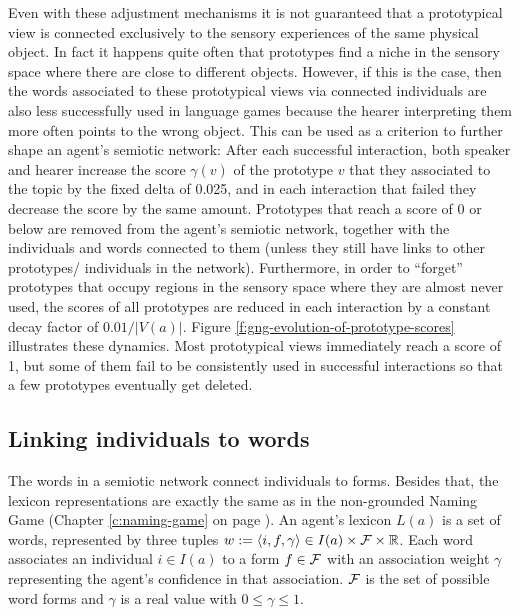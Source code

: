 Even with these adjustment mechanisms it is not guaranteed that a
prototypical view is connected exclusively to the sensory experiences
of the same physical object. In fact it happens quite often that
prototypes find a niche in the sensory space where there are close to
different objects. However, if this is the case, then the words
associated to these prototypical views via connected individuals are
also less successfully used in language games because the hearer
interpreting them more often points to the wrong object. This can be
used as a criterion to further shape an agent's semiotic network:
After each successful interaction, both speaker and hearer increase
the score $\gamma(v)$ of the prototype $v$ that they associated to the
topic by the fixed delta of 0.025, and in each interaction that failed
they decrease the score by the same amount. Prototypes that reach a
score of 0 or below are removed from the agent's semiotic network,
together with the individuals and words connected to them (unless they
still have links to other prototypes/ individuals in the
network). Furthermore, in order to ``forget'' prototypes that occupy
regions in the sensory space where they are almost never used, the
scores of all prototypes are reduced in each interaction by a constant
decay factor of $0.01 / |V(a)|$. Figure
\ref{f:gng-evolution-of-prototype-scores} illustrates these
dynamics. Most prototypical views immediately reach a score of 1, but
some of them fail to be consistently used in successful interactions
so that a few prototypes eventually get deleted.


\subsection{Linking individuals to words}
\label{s:gng-lexicon}

The words in a semiotic network connect individuals to forms. Besides
that, the lexicon representations are exactly the same as in the
non-grounded Naming Game (Chapter \ref{c:naming-game} on page
\pageref{c:naming-game}). An agent's lexicon $L(a)$ is a set of words,
represented by three tuples $w := \langle i, f, \gamma \rangle \in
I(a)\times{\cal F}\times \mathbb{R}$. Each word associates an
individual $i \in I(a)$ to a form $f \in {\cal F}$ with an association
weight $\gamma$ representing the agent's confidence in that
association. ${\cal F}$ is the set of possible word forms and $\gamma$
is a real value with $0 \leq \gamma \leq 1$.

